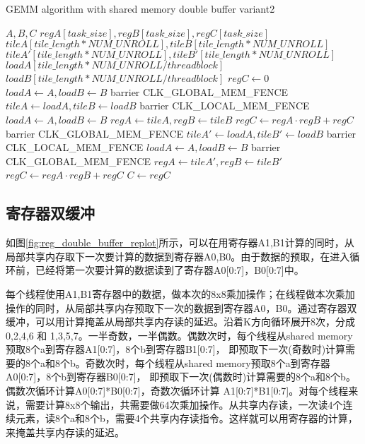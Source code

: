 \begin{algorithm}[htbp]
	\small
	\caption{GEMM algorithm with shared memory double buffer variant2}\label{alg:gemm_sharedmem_v2}
	\begin{algorithmic}[1]
		\State $A, B, C$
		\State $regA[task\_size],regB[task\_size],regC[task\_size]$
		\State $tileA[tile\_length*NUM\_UNROLL],tileB[tile\_length*NUM\_UNROLL]$
		\State $tileA'[tile\_length*NUM\_UNROLL],tileB'[tile\_length*NUM\_UNROLL]$
		\State $loadA[tile\_length*NUM\_UNROLL/threadblock]$
		\State $loadB[tile\_length*NUM\_UNROLL/threadblock]$
		\State $regC \gets 0$
		\State $loadA \gets A, loadB \gets B $
		\State barrier CLK\_GLOBAL\_MEM\_FENCE
		\State $tileA \gets loadA, tileB \gets loadB$
		\State barrier CLK\_LOCAL\_MEM\_FENCE
		\State $loadA \gets A, loadB \gets B $
		\State $regA \gets tileA, regB \gets tileB$
		\State $regC \gets regA \cdot regB + regC$
		\EndFor
		\Else
		\State barrier CLK\_GLOBAL\_MEM\_FENCE  
		\State $tileA' \gets loadA, tileB' \gets loadB$
		\State barrier CLK\_LOCAL\_MEM\_FENCE
		\State $loadA \gets A, loadB \gets B $
		\State barrier CLK\_GLOBAL\_MEM\_FENCE
		\State $regA \gets tileA', regB \gets tileB'$
		\State $regC \gets regA \cdot regB + regC$
		\EndFor
		\EndIf
		\EndFor\label{gemmendfor}
		\State $C \gets regC$
	\end{algorithmic}
\end{algorithm}

\subsection{寄存器双缓冲}
如图\ref{fig:reg_double_buffer_replot}所示，可以在用寄存器A1,B1计算的同时，从局部共享内存取下一次要计算的数据到寄存器A0,B0。由于数据的预取，在进入循环前，已经将第一次要计算的数据读到了寄存器A0[0:7]，B0[0:7]中。

每个线程使用A1,B1寄存器中的数据，做本次的8x8乘加操作；在线程做本次乘加操作的同时，从局部共享内存预取下一次的数据到寄存器A0，B0。通过寄存器双缓冲，可以用计算掩盖从局部共享内存读的延迟。沿着K方向循环展开8次，分成0,2,4,6 和 1,3,5,7。一半奇数，一半偶数。偶数次时，每个线程从shared memory预取8个a到寄存器A1[0:7]，8个b到寄存器B1[0:7]， 即预取下一次(奇数时)计算需要的8个a和8个b。奇数次时，每个线程从shared memory预取8个a到寄存器A0[0:7]，8个b到寄存器B0[0:7]， 即预取下一次(偶数时)计算需要的8个a和8个b。偶数次循环计算A0[0:7]*B0[0:7]，奇数次循环计算 A1[0:7]*B1[0:7]。对每个线程来说，需要计算8x8个输出，共需要做64次乘加操作。从共享内存读，一次读4个连续元素，读8个a和8个b，需要4个共享内存读指令。这样就可以用寄存器的计算，来掩盖共享内存读的延迟。

